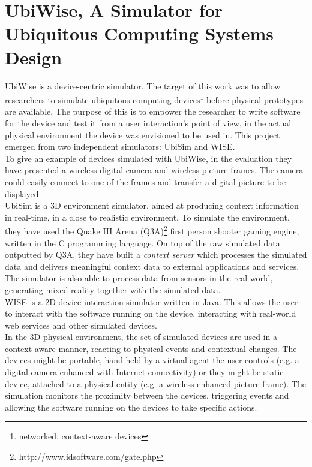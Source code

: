 \section{UbiWise, A Simulator for Ubiquitous Computing Systems Design}\label{sec:ubiwise}

UbiWise \cite{barton2003ubiwise} is a device-centric simulator. The target of this work was to allow researchers to simulate ubiquitous computing devices\footnote{networked, context-aware devices} before physical prototypes are available. The purpose of this is to empower the researcher to write software for the device and test it from a user interaction's point of view, in the actual physical environment the device was envisioned to be used in. This project emerged from two independent simulators: UbiSim and WISE.\\

To give an example of devices simulated with UbiWise, in the evaluation they have presented a wireless digital camera and wireless picture frames. The camera could easily connect to one of the frames and transfer a digital picture to be displayed.\\

UbiSim is a 3D environment simulator, aimed at producing context information in real-time, in a close to realistic environment. To simulate the environment, they have used the Quake III Arena (Q3A)\footnote{http://www.idsoftware.com/gate.php} first person shooter gaming engine, written in the C programming language. On top of the raw simulated data outputted by Q3A, they have built a \emph{context server} which processes the simulated data and delivers meaningful context data to external applications and services. The simulator is also able to process data from sensors in the real-world, generating mixed reality together with the simulated data.\\

WISE is a 2D device interaction simulator written in Java. This allows the user to interact with the software running on the device, interacting with real-world web services and other simulated devices.\\

In the 3D physical environment, the set of simulated devices are used in a context-aware manner, reacting to physical events and contextual changes. The devices might be portable, hand-held by a virtual agent the user controls (e.g. a digital camera enhanced with Internet connectivity) or they might be static device, attached to a physical entity (e.g. a wireless enhanced picture frame). The simulation monitors the proximity between the devices, triggering events and allowing the software running on the devices to take specific actions.\\

